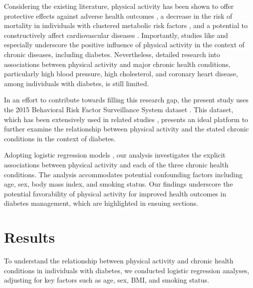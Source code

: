 \documentclass[11pt]{article}
\begin{document}
Considering the existing literature, physical activity has been shown to offer protective effects against adverse health outcomes \cite{Hamer2012LowDosePA, Gebreab2015GeographicVI}, a decrease in the risk of mortality in individuals with clustered metabolic risk factors \cite{Stein2015AssociationBP, Devaraj2020CardiovascularHI, Bowles2002TheAB}, and a potential to constructively affect cardiovascular diseases \cite{Fretts2014LifesS7, Fang2012StatusOC}. Importantly, studies like \cite{Franssen2020CanCW} and \cite{Rubin2014ImpactOI} especially underscore the positive influence of physical activity in the context of chronic diseases, including diabetes. Nevertheless, detailed research into associations between physical activity and major chronic health conditions, particularly high blood pressure, high cholesterol, and coronary heart disease, among individuals with diabetes, is still limited.

In an effort to contribute towards filling this research gap, the present study uses the 2015 Behavioral Risk Factor Surveillance System dataset \cite{Heslin2021SexualOD}. This dataset, which has been extensively used in related studies \cite{Lu2012MultivariateLR, Dessie2021MortalityrelatedRF, Cawley2018ThirdYO, Rolle-Lake2020BehavioralRF, Maddaloni2015LatentAD, Iachan2016NationalWO}, presents an ideal platform to further examine the relationship between physical activity and the stated chronic conditions in the context of diabetes.

Adopting logistic regression models \cite{Walraven2009AMO, Lu2012MultivariateLR, Partridge2012InadequatePC, Johnson2002DecreasedMA, Anderson2009RisksOM, Plotnikoff2006FactorsAW}, our analysis investigates the explicit associations between physical activity and each of the three chronic health conditions. The analysis accommodates potential confounding factors including age, sex, body mass index, and smoking status. Our findings underscore the potential favorability of physical activity for improved health outcomes in diabetes management, which are highlighted in ensuing sections.

\section*{Results}

To understand the relationship between physical activity and chronic health conditions in individuals with diabetes, we conducted logistic regression analyses, adjusting for key factors such as age, sex, BMI, and smoking status. 
\end{document}
